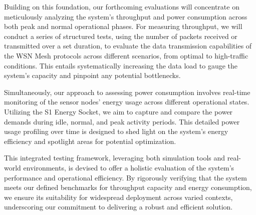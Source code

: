 Building on this foundation, our forthcoming evaluations will concentrate on meticulously analyzing the system's throughput and power consumption across both peak and normal operational phases. For measuring throughput, we will conduct a series of structured tests, using the number of packets received or transmitted over a set duration, to evaluate the data transmission capabilities of the WSN Mesh protocols across different scenarios, from optimal to high-traffic conditions. This entails systematically increasing the data load to gauge the system's capacity and pinpoint any potential bottlenecks.

Simultaneously, our approach to assessing power consumption involves real-time monitoring of the sensor nodes' energy usage across different operational states. Utilizing the S1 Energy Socket, we aim to capture and compare the power demands during idle, normal, and peak activity periods. This detailed power usage profiling over time is designed to shed light on the system's energy efficiency and spotlight areas for potential optimization.

This integrated testing framework, leveraging both simulation tools and real-world environments, is devised to offer a holistic evaluation of the system's performance and operational efficiency. By rigorously verifying that the system meets our defined benchmarks for throughput capacity and energy consumption, we ensure its suitability for widespread deployment across varied contexts, underscoring our commitment to delivering a robust and efficient solution.




